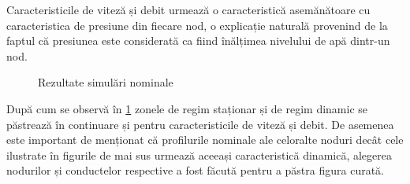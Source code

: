 Caracteristicile de viteză și debit urmează o caracteristică asemănătoare cu caracteristica de presiune din fiecare nod, o explicație naturală provenind de la faptul că presiunea este considerată ca fiind înălțimea nivelului de apă dintr-un nod.

\begin{figure}[H]
\centering

\qquad
{}

\caption{Rezultate simulări nominale}
\label{fig:ref_demand_vel}
\end{figure}

După cum se observă în \ref{fig:ref_demand_vel} zonele de regim staționar și de regim dinamic se păstrează în continuare și pentru caracteristicile de viteză și debit. De asemenea este important de menționat că profilurile nominale ale celoralte noduri decât cele ilustrate în figurile de mai sus urmează aceeași caracteristică dinamică, alegerea nodurilor și conductelor respective a fost făcută pentru a păstra figura curată.




